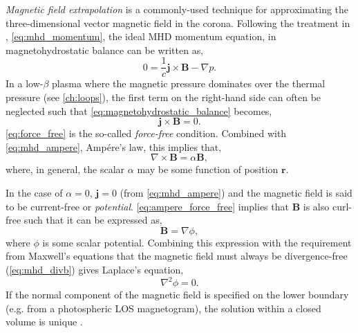 \textit{Magnetic field extrapolation} is a commonly-used technique for approximating the three-dimensional vector magnetic field in the corona. Following the treatment in \citet[Chapter 3]{priest_magnetohydrodynamics_2014}, \autoref{eq:mhd_momentum}, the ideal MHD momentum equation, in magnetohydrostatic balance can be written as,
\begin{equation}\label{eq:magnetohydrostatic_balance}
    0 = \frac{1}{c}\mathbf{j}\times\mathbf{B} - \nabla p.
\end{equation}
In a low-$\beta$ plasma where the magnetic pressure dominates over the thermal pressure (see \autoref{ch:loops}), the first term on the right-hand side can often be neglected such that \autoref{eq:magnetohydrostatic_balance} becomes,
\begin{equation}\label{eq:force_free}
    \mathbf{j}\times\mathbf{B} = 0.
\end{equation}
\autoref{eq:force_free} is the so-called \textit{force-free} condition. Combined with \autoref{eq:mhd_ampere}, Amp\'{e}re's law, this implies that,
\begin{equation}\label{eq:ampere_force_free}
    \nabla\times\mathbf{B} = \alpha\mathbf{B},
\end{equation}
where, in general, the scalar $\alpha$ may be some function of position $\mathbf{r}$.

In the case of $\alpha=0$, $\mathbf{j}=0$ (from \autoref{eq:mhd_ampere}) and the magnetic field is said to be current-free or \textit{potential}. \autoref{eq:ampere_force_free} implies that $\mathbf{B}$ is also curl-free such that it can be expressed as,
\begin{equation}\label{eq:b_potential}
    \mathbf{B}=\nabla\phi,
\end{equation}
 where $\phi$ is some scalar potential. Combining this expression with the requirement from Maxwell's equations that the magnetic field must always be divergence-free (\autoref{eq:mhd_divb}) gives Laplace's equation,
\begin{equation}\label{eq:laplace}
    \nabla^2\phi = 0.
\end{equation}
If the normal component of the magnetic field is specified on the lower boundary (e.g. from a photospheric LOS magnetogram), the solution within a closed volume is unique \citep{priest_magnetohydrodynamics_2014}.

